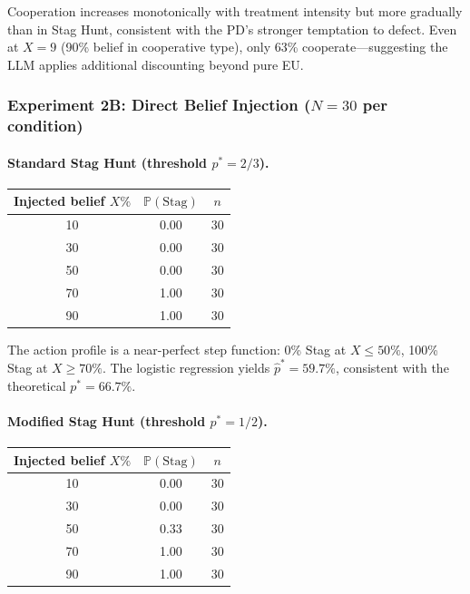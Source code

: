 \documentclass[12pt]{article}
\newcommand{\Prob}{\mathbb{P}}
\begin{document}
Cooperation increases monotonically with treatment intensity but more gradually than in Stag Hunt, consistent with the PD's stronger temptation to defect. Even at $X=9$ (90\% belief in cooperative type), only 63\% cooperate---suggesting the LLM applies additional discounting beyond pure EU.


\subsubsection{Experiment 2B: Direct Belief Injection ($N=30$ per condition)}

\paragraph{Standard Stag Hunt (threshold $p^*=2/3$).}

\begin{center}
\begin{tabular}{@{}ccc@{}}
\toprule
Injected belief $X\%$ & $\Prob(\text{Stag})$ & $n$ \\
\midrule
10 & 0.00 & 30 \\
30 & 0.00 & 30 \\
50 & 0.00 & 30 \\
70 & 1.00 & 30 \\
90 & 1.00 & 30 \\
\bottomrule
\end{tabular}
\end{center}

The action profile is a near-perfect step function: 0\% Stag at $X \leq 50\%$, 100\% Stag at $X \geq 70\%$. The logistic regression yields $\hat{p}^* = 59.7\%$, consistent with the theoretical $p^* = 66.7\%$.

\paragraph{Modified Stag Hunt (threshold $p^*=1/2$).}

\begin{center}
\begin{tabular}{@{}ccc@{}}
\toprule
Injected belief $X\%$ & $\Prob(\text{Stag})$ & $n$ \\
\midrule
10 & 0.00 & 30 \\
30 & 0.00 & 30 \\
50 & 0.33 & 30 \\
70 & 1.00 & 30 \\
90 & 1.00 & 30 \\
\bottomrule
\end{tabular}
\end{center}
\end{document}
